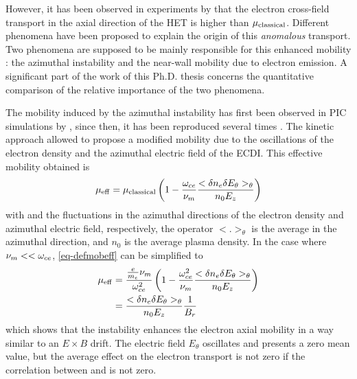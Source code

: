   However, it has been observed in experiments by \citet{meezan2001} that the electron cross-field transport in the axial direction of the \ac{HET} is higher than $\mu_{\mathrm{classical}}$.
  Different phenomena have been proposed to explain the origin of this \emph{anomalous} transport.
  Two phenomena are supposed to be mainly responsible for this enhanced mobility \citep{croes2017}\string: the azimuthal instability and the near-wall mobility due to electron emission.
  A significant part of the work of this Ph.D. thesis concerns the quantitative comparison of the relative importance of the two phenomena.
  
  The mobility induced by the azimuthal instability has first been observed in \ac{PIC} simulations by \citet{adam2004}, since then, it has been reproduced several times \citep{adam2008a,heron2013,lafleur2016a,croes2017,boeuf2018,taccogna2019}.
  The kinetic approach allowed \citet{lafleur2016a} to propose a modified mobility due to the oscillations of the electron density and the azimuthal electric field of the \ac{ECDI}.
  This effective mobility obtained is 
  \begin{equation} \label{eq-defmobeff}
    \mu_{\mathrm{eff}} = \mu_{\mathrm{classical}} \left( 1 - \frac{\omega_{ce}}{\nu_m}  \frac{< \delta n_e \delta E_{\theta} >_{\theta} }{n_0 E_z}   \right)
  \end{equation}
  with \dne{} and \dEt{} the fluctuations in the azimuthal directions of the electron density and azimuthal electric field, respectively, the operator $< . >_{\theta}$ is the average in the azimuthal direction, and $n_0$ is the average plasma density.
  In the case where $\nu_m << \omega_{ce}$, \cref{eq-defmobeff} can be simplified to 
  \begin{align} 
    \mu_{\mathrm{eff}} &= \frac{\frac{e}{m_e} \nu_m}{\omega_{ce}^2} \left( 1 - \frac{\omega_{ce}^2}{\nu_m}  \frac{< \delta n_e \delta E_{\theta} >_{\theta} }{n_0 E_z}   \right) \nonumber \\
    &= \frac{< \delta n_e \delta E_{\theta} >_{\theta} }{n_0 E_z}   \frac{1}{B_r} \label{eq-mobeffsimple}
  \end{align}
  which shows that the instability enhances the electron axial mobility in a way similar to an $E \times B$ drift.
  The electric field $E_{\theta}$ oscillates and presents a zero mean value, but the average effect on the electron transport is not zero if the correlation between \dEt{} and \dne{} is not zero.
  
